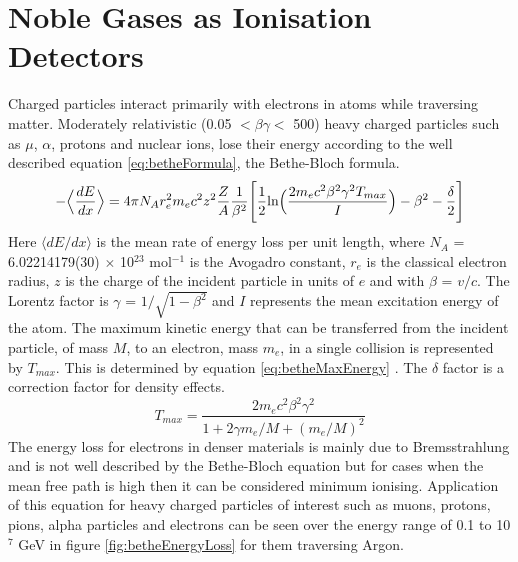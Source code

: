 \section{Noble Gases as Ionisation Detectors}
Charged particles interact primarily with electrons in atoms while traversing matter. Moderately relativistic (0.05 $< \beta\gamma <$ 500) heavy charged particles such as $\mu$, $\alpha$, protons and nuclear ions, lose their energy according to the well described equation \ref{eq:betheFormula}, the Bethe-Bloch formula\cite{radiationLengthsBook}. 
\begin{equation}
	- \Big\langle\frac{dE}{dx}\Big\rangle = 4 \pi N_{A}r^{2}_{e}m_{e}c^{2}z^{2}\frac{Z}{A}\frac{1}{\beta^{2}}\Bigg[ \frac{1}{2} \textnormal{ln} \Big( \frac{2m_{e}c^{2}\beta^{2}\gamma^{2}T_{max}}{I} \Big) - \beta^{2} - \frac{\delta}{2} \Bigg]
	\label{eq:betheFormula}
\end{equation}
Here $\langle dE/dx\rangle$ is the mean rate of energy loss per unit length, where $N_{A}$ = 6.02214179(30) $\times$ 10$^{23}$ mol$^{-1}$ is the Avogadro constant, $r_{e}$ is the classical electron radius, $z$ is the charge of the incident particle in units of $e$ and with $\beta$ = $v/c$. The Lorentz factor is $\gamma$ = $1/\sqrt{1-\beta^{2}}$ and $I$ represents the mean excitation energy of the atom. The maximum kinetic energy that can be transferred from the incident particle, of mass $M$, to an electron, mass $m_{e}$, in a single collision is represented by $T_{max}$. This is determined by equation \ref{eq:betheMaxEnergy} \cite{radiationLengthsBook}. The $\delta$ factor is a correction factor for density effects. 
\begin{equation}
	T_{max} = \frac{2m_{e}c^{2}\beta^{2}\gamma^{2}}{1 + 2\gamma m_{e}/M + (m_{e}/M)^{2}}
	\label{eq:betheMaxEnergy}
\end{equation}
The energy loss for electrons in denser materials is mainly due to Bremsstrahlung and is not well described by the Bethe-Bloch equation but for cases when the mean free path is high then it can be considered minimum ionising. Application of this equation for heavy charged particles of interest such as muons, protons, pions, alpha particles and electrons can be seen over the energy range of 0.1 to 10$^{7}$ GeV in figure \ref{fig:betheEnergyLoss} for them traversing Argon.

